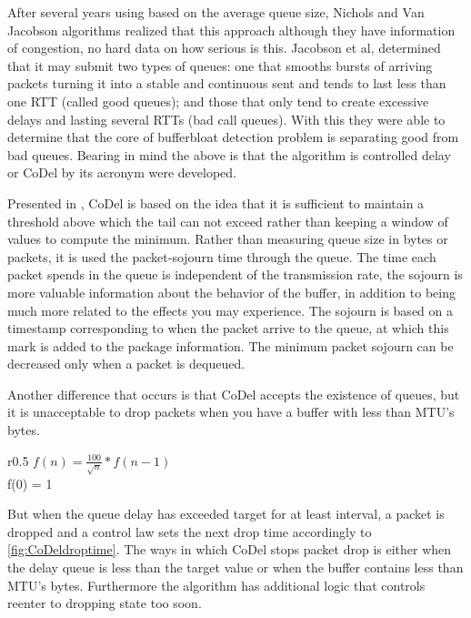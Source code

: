 After several years using based on the average queue size, Nichols and Van
Jacobson algorithms realized that this approach although they have information
of congestion, no hard data on how serious is this. Jacobson et al, determined
that it may submit two types of queues: one that smooths bursts of arriving
packets turning it into a stable and continuous sent and tends to last less
than one RTT (called good queues); and those that only tend to create
excessive delays and lasting several RTTs (bad call queues). With this they
were able to determine that the core of bufferbloat detection problem is
separating good from bad queues. Bearing in mind the above is that the
algorithm is controlled delay or CoDel by its acronym were developed.

Presented in \cite{NicholsJacobsonCQD}, CoDel is based on the idea that it is
sufficient to maintain a threshold above which the tail can not exceed rather
than keeping a window of values to compute the minimum. Rather than measuring
queue size in bytes or packets, it is used the packet-sojourn time through the
queue. The time each packet spends in the queue is independent of the
transmission rate, the \gls{sojourn} is more valuable information about the behavior
of the buffer, in addition to being much more related to the effects you may
experience. The sojourn is based on a timestamp corresponding to when the
packet arrive to the queue, at which this mark is added to the package
information. The minimum packet sojourn can be decreased only when a packet is
dequeued.

Another difference that occurs is that CoDel accepts the existence of queues,
but it is unacceptable to drop packets when you have a buffer with less than
\gls{MTU}'s bytes.

\begin{wrapfigure}{r}{0.5\textwidth}
    \centering
	$f(n) = \frac{100}{\sqrt{n}}*f(n-1)$ \\
	f(0) = 1
    \caption[CoDel droptime interval]{CoDel droptime interval, n=iteration}
    \label{fig:CoDeldroptime}
\end{wrapfigure}

But when the queue delay has exceeded target for at least interval, a packet
is dropped and a control law sets the next drop time accordingly to
\ref{fig:CoDeldroptime}. The ways in which CoDel stops packet drop is either
when the delay queue is less than the target value or when the buffer contains
less than MTU's bytes. Furthermore the algorithm has additional logic that
controls reenter to dropping state too soon.


